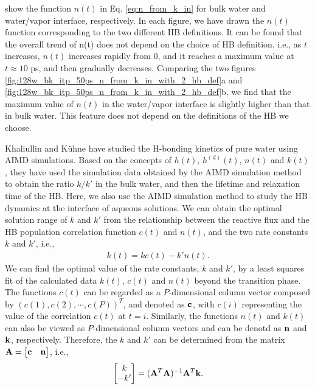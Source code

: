 {show the function $n(t)$ in Eq. \ref{eq:n_from_k_in} for bulk water and water/vapor interface, respectively. 
In each figure, we have drawn the $n(t)$ function corresponding to the two different HB definitions. 
It can be found that the overall trend of n(t) does not depend on the choice of HB definition.
i.e., as $t$ increases, $n(t)$ increases rapidly from 0, and it reaches a maximum value at $t \approx 10$ ps, and then gradually decreases. %
Comparing the two figures \ref{fig:128w_bk_itp_50ps_n_from_k_in_with_2_hb_def}a and \ref{fig:128w_bk_itp_50ps_n_from_k_in_with_2_hb_def}b,
we find that the maximum value of $n(t)$ in the water/vapor interface is slightly higher than that in bulk water. 
This feature does not depend on the definitions of the HB we choose.

Khaliullin and K\"uhne have studied the H-bonding kinetics of pure water using AIMD simulations. \cite{Khaliullin2013}
Based on the concepts of $h(t)$, $h^{(d)}(t)$, $n(t)$ and $k(t)$, they have used the simulation data 
obtained by the AIMD simulation method to obtain the ratio $k/k'$ in the bulk water, and then the lifetime and relaxation time 
of the HB.  Here, we also use the AIMD simulation method to study the HB dynamics at the interface of aqueous 
solutions. We can obtain the optimal solution range of $k$ and $k'$ from the relationship 
between the reactive flux and the HB population correlation function $c(t)$ and $n(t)$, and the two rate constants $k$ and $k'$, i.e.,
\begin{eqnarray}
  k(t) = kc(t)-k'n(t).
\label{eq:fitting_k_rates}
\end{eqnarray}
%
We can find the optimal value of the rate constants, $k$ and $k'$, 
by a least squares fit of the calculated data $k(t)$, $c(t)$ and $n(t)$ beyond the transition phase.  
The functions $c(t)$ can be regarded as a $P$-dimensional column vector composed by $(c(1),c(2),\cdots,c(P))^T$, and denoted as ${\bf c}$,
with $c(i)$ representing the value of the correlation $c(t)$ at $t=i$.
Similarly, the functions $n(t)$ and $k(t)$ can also be viewed as $P$-dimensional column vectors and can be denotd as ${\bf n}$ and ${\bf k}$, respectively.
Therefore, the $k$ and $k'$ can be determined from the matrix ${\bf A} = \begin{bmatrix} {\bf c} & {\bf n} \end{bmatrix}$, i.e., 
\begin{equation}
\begin{bmatrix} k\\ -k' \end{bmatrix} = ({\bf A}^T {\bf A})^{-1} {\bf A}^T {\bf k}. 

\end{equation}}
